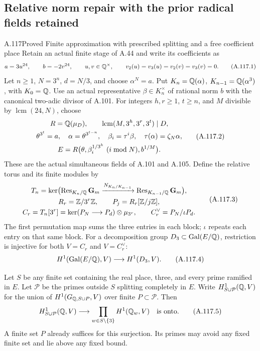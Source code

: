 \subsection{Relative norm repair with the prior radical fields retained}

\begin{statement}{A.117}{Proved}
{Finite approximation with prescribed splitting and a free coefficient place}
Retain an actual finite stage of A.44 and write its coefficients as
\[
 a=3u^{24},\qquad b=-2v^{24},\qquad u,v\in\mathbb Q^\times,
 \qquad v_2(u)=v_3(u)=v_2(v)=v_3(v)=0.
 \tag{A.117.1}
\]
Let \(n\ge1\), \(N=3^n\), \(d=N/3\), and choose
\(\alpha^N=a\).  Put \(K_n=\mathbb Q(\alpha)\),
\(K_{n-1}=\mathbb Q(\alpha^3)\), with \(K_0=\mathbb Q\).
Use an actual representative \(\beta\in K_n^\times\) of rational
norm \(b\) with the canonical two-adic divisor of A.101.
For integers \(h,r\ge1\), \(t\ge n\), and \(M\) divisible by
\(\operatorname{lcm}(24,N)\), choose
\[
 \begin{gathered}
 R=\mathbb Q(\mu_D),\qquad
       \operatorname{lcm}(M,3^h,3^r,3^t)\mid D,\\
 \theta^{3^t}=a,\quad \alpha=\theta^{3^{t-n}},
 \quad \beta_i=\tau^i\beta,\quad
       \tau(\alpha)=\zeta_N\alpha,\\
 E=R\bigl(\theta,\beta_i^{1/3^h}\ (i\bmod N),b^{1/M}\bigr).
 \end{gathered}
 \tag{A.117.2}
\]
These are the actual simultaneous fields of A.101 and A.105.
Define the relative torus and its finite modules by
\[
 \begin{gathered}
 T_n=\ker\bigl(\operatorname{Res}_{K_n/\mathbb Q}\mathbf G_m
          \xrightarrow{N_{K_n/K_{n-1}}}
                         \operatorname{Res}_{K_{n-1}/\mathbb Q}\mathbf G_m\bigr),\\
 R_r=\mathbb Z/3^r\mathbb Z,\qquad P_j=R_r[\mathbb Z/j\mathbb Z],\\
 C_r=T_n[3^r]=\ker(P_N\longrightarrow P_d)\otimes\mu_{3^r},
 \qquad C_r^\vee=P_N/\iota P_d .
 \end{gathered}
 \tag{A.117.3}
\]
The first permutation map sums the three entries in each block;
\(\iota\) repeats each entry on that same block.
For a decomposition group \(D_3\subset\operatorname{Gal}(E/\mathbb Q)\),
restriction is injective for both \(V=C_r\) and \(V=C_r^\vee\):
\[
 H^1(\operatorname{Gal}(E/\mathbb Q),V)
                 \longrightarrow H^1(D_3,V).
 \tag{A.117.4}
\]

Let \(S\) be any finite set containing the real place, three,
and every prime ramified in \(E\).  Let \(\mathcal P\) be the
primes outside \(S\) splitting completely in \(E\).
Write \(H^1_{S\cup\mathcal P}(\mathbb Q,V)\) for the union of
\(H^1(G_{\mathbb Q,S\cup P},V)\) over finite \(P\subset\mathcal P\).
Then
\[
 H^1_{S\cup\mathcal P}(\mathbb Q,V)\longrightarrow
                  \prod_{w\in S\setminus\{3\}}H^1(\mathbb Q_w,V)
             \quad\hbox{is onto}.
 \tag{A.117.5}
\]
A finite set \(P\) already suffices for this surjection.
Its primes may avoid any fixed finite set and lie above any
fixed bound.


\end{statement}
